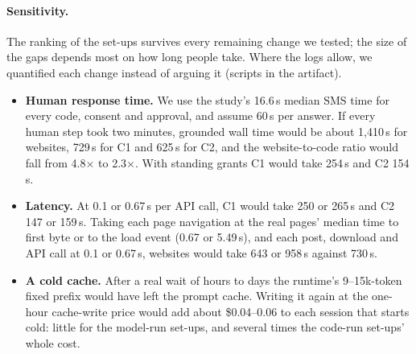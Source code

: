 \paragraph{Sensitivity.}
The ranking of the set-ups survives every remaining change we tested; the size of the gaps depends most on how long people take. Where the logs allow, we quantified each change instead of arguing it (scripts in the artifact).
\begin{itemize}
\item \textbf{Human response time.} We use the study's 16.6\,s median SMS time for every code, consent and approval, and assume 60\,s per answer. If every human step took two minutes, grounded wall time would be about 1{,}410\,s for websites, 729\,s for C1 and 625\,s for C2, and the website-to-code ratio would fall from 4.8$\times$ to 2.3$\times$. With standing grants C1 would take 254\,s and C2 154\,s.
\item \textbf{Latency.} At 0.1 or 0.67\,s per API call, C1 would take 250 or 265\,s and C2 147 or 159\,s. Taking each page navigation at the real pages' median time to first byte or to the load event (0.67 or 5.49\,s), and each post, download and API call at 0.1 or 0.67\,s, websites would take 643 or 958\,s against 730\,s.
\item \textbf{A cold cache.} After a real wait of hours to days the runtime's 9--15k-token fixed prefix would have left the prompt cache. Writing it again at the one-hour cache-write price would add about \$0.04--0.06 to each session that starts cold: little for the model-run set-ups, and several times the code-run set-ups' whole cost.
\end{itemize}
